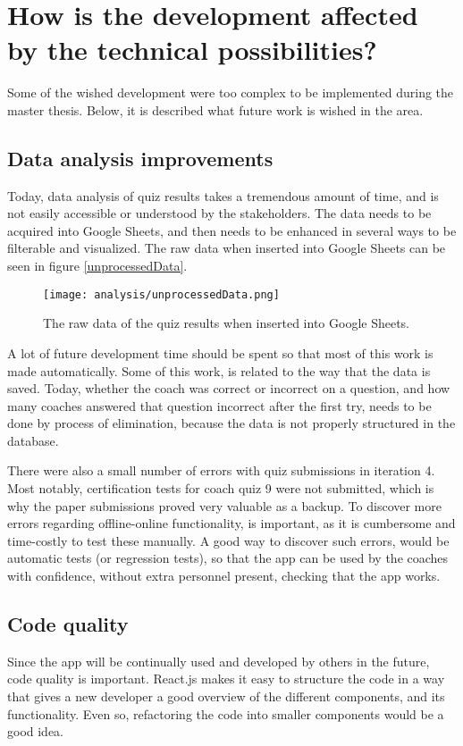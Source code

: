 \section{How is the development affected by the technical possibilities?}\label{rq1}

Some of the wished development were too complex to be implemented during the master thesis. Below, it is described what future work is wished in the area.

\subsection{Data analysis improvements}
Today, data analysis of quiz results takes a tremendous amount of time, and is not easily accessible or understood by the stakeholders. The data needs to be acquired into Google Sheets, and then needs to be enhanced in several ways to be filterable and visualized. The raw data when inserted into Google Sheets can be seen in figure \ref{unprocessedData}.

\begin{figure}[h]
  \centering
  \texttt{[image: analysis/unprocessedData.png]}
  \caption{The raw data of the quiz results when inserted into Google Sheets.}
  \label{fig:unprocessedData}
\end{figure}

A lot of future development time should be spent so that most of this work is made automatically. Some of this work, is related to the way that the data is saved. Today, whether the coach was correct or incorrect on a question, and how many coaches answered that question incorrect after the first try, needs to be done by process of elimination, because the data is not properly structured in the database.

There were also a small number of errors with quiz submissions in iteration 4. Most notably, certification tests for coach quiz 9 were not submitted, which is why the paper submissions proved very valuable as a backup. To discover more errors regarding offline-online functionality, is important, as it is cumbersome and time-costly to test these manually. A good way to discover such errors, would be automatic tests (or regression tests), so that the app can be used by the coaches with confidence, without extra personnel present, checking that the app works.

\subsection{Code quality}
Since the app will be continually used and developed by others in the future, code quality is important. React.js makes it easy to structure the code in a way that gives a new developer a good overview of the different components, and its functionality. Even so, refactoring the code into smaller components would be a good idea.

